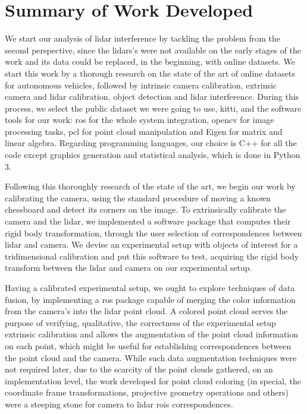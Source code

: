 \section{Summary of Work Developed}
We start our analysis of \ac{lidar} interference by tackling the problem from the second perspective, since the \acp{lidar}'s were not available on the early stages of the work and its data could be replaced, in the beginning, with online datasets. We start this work by a thorough research on the state of the art of online datasets for autonomous vehicles, followed by intrinsic camera calibration, extrinsic camera and \ac{lidar} calibration, object detection and \ac{lidar} interference. During this process, we select the public dataset we were going to use, \ac{kitti}, and the software tools for our work: \ac{ros} for the whole system integration, \ac{opencv} for image processing tasks, \ac{pcl} for point cloud manipulation and Eigen for matrix and linear algebra. Regarding programming languages, our choice is C++ for all the code except graphics generation and statistical analysis, which is done in Python 3. 

Following this thoroughly research of the state of the art, we begin our work by calibrating the camera, using the standard procedure of moving a known chessboard and detect its corners on the image. To extrinsically calibrate the camera and the \ac{lidar}, we implemented a software package that computes their rigid body transformation, through the user selection of  correspondences between \ac{lidar} and camera. We devise an experimental setup with objects of interest for a tridimensional calibration and put this software to test, acquiring the rigid body transform between the \ac{lidar} and camera on our experimental setup.

Having a calibrated experimental setup, we ought to explore techniques of data fusion, by implementing a \ac{ros} package capable of merging the color information from the camera's into the \ac{lidar} point cloud. A colored point cloud serves the purpose of verifying, qualitative, the correctness of the experimental setup extrinsic calibration and allows the augmentation of the point cloud information on each point,  which might be useful for establishing correspondences between the point cloud and the camera. While such data augmentation techniques were not required later, due to the scarcity of the point clouds gathered, on an implementation level, the work developed for point cloud coloring (in special, the coordinate frame transformations, projective geometry operations and others) were a steeping stone for camera to \ac{lidar} \acfp{roi} correspondences.

